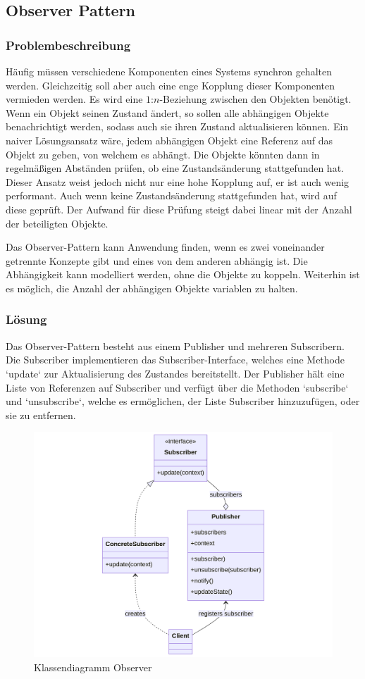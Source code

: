 \subsection{Observer Pattern}


\subsubsection*{Problembeschreibung}

Häufig müssen verschiedene Komponenten eines Systems synchron gehalten werden. Gleichzeitig soll aber auch eine enge Kopplung dieser Komponenten vermieden werden. Es wird eine $1$:$n$-Beziehung zwischen den Objekten benötigt. Wenn ein Objekt seinen Zustand ändert, so sollen alle abhängigen Objekte benachrichtigt werden, sodass auch sie ihren Zustand aktualisieren können. Ein naiver Lösungsansatz wäre, jedem abhängigen Objekt eine Referenz auf das Objekt zu geben, von welchem es abhängt. Die Objekte könnten dann in regelmäßigen Abständen prüfen, ob eine Zustandsänderung stattgefunden hat. Dieser Ansatz weist jedoch nicht nur eine hohe Kopplung auf, er ist auch wenig performant. Auch wenn keine Zustandsänderung stattgefunden hat, wird auf diese geprüft. Der Aufwand für diese Prüfung steigt dabei linear mit der Anzahl der beteiligten Objekte.

Das Observer-Pattern kann Anwendung finden, wenn es zwei voneinander getrennte Konzepte gibt und eines von dem anderen abhängig ist. Die Abhängigkeit kann modelliert werden, ohne die Objekte zu koppeln. Weiterhin ist es möglich, die Anzahl der abhängigen Objekte variablen zu halten.  

\subsubsection*{Lösung}

Das Observer-Pattern besteht aus einem Publisher und mehreren Subscribern. Die Subscriber implementieren das Subscriber-Interface, welches eine Methode `update`  zur Aktualisierung des Zustandes bereitstellt. Der Publisher hält eine Liste von Referenzen auf Subscriber und verfügt über die Methoden `subscribe` und `unsubscribe`, welche es ermöglichen, der Liste Subscriber hinzuzufügen, oder sie zu entfernen. 

\begin{figure}[!hb]
	\centering
	\includegraphics[width=0.75\linewidth]{images/patterns/observer-class.png}
	\caption{Klassendiagramm Observer}
	\label{fig:observer-class}
\end{figure}

